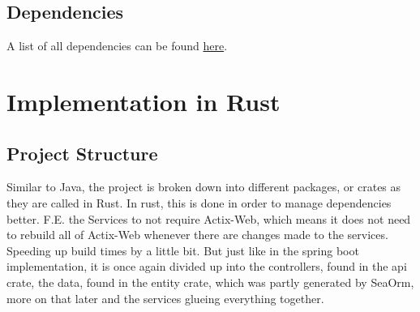 \documentclass[a4paper,12pt]{article}
\begin{document}
	\subsection{Dependencies}
	A list of all dependencies can be found \href{https://github.com/casqan/actix-eval-mono/blob/develop/backend-spring/pom.xml}{here}.

	\section{Implementation in Rust}
	\label{sec:rust_implementation}
	\subsection{Project Structure}
	\label{subsec:project_structure_rust}
	\begin{minipage}{0.4\textwidth}
	\clearpage
	\end{minipage}%
	\begin{minipage}{0.6\textwidth}
		Similar to Java, the project is broken down into different packages, or crates as they are called
		in Rust. In rust, this is done in order to manage dependencies better. F.E. the Services to not
		require Actix-Web, which means it does not need to rebuild all of Actix-Web whenever there are
		changes made to the services. Speeding up build times by a little bit. But just like in the 
		spring boot implementation, it is once again divided up into the controllers, found in the api
		crate, the data, found in the entity crate, which was partly generated by SeaOrm, more on that
		later and the services glueing everything together.
	\end{minipage}%
\end{document}
